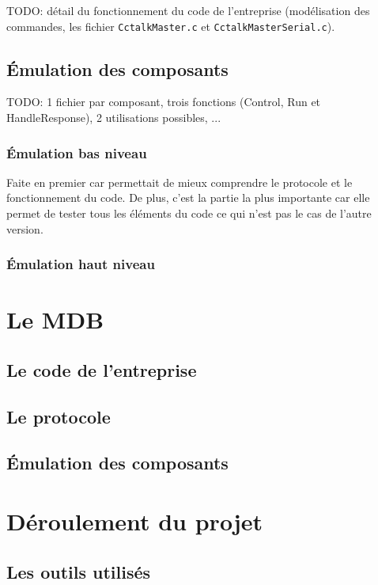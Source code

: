 \documentclass[a4paper]{article}
\begin{document}
TODO: détail du fonctionnement du code de l'entreprise (modélisation des
commandes, les fichier \lstinline{CctalkMaster.c} et
\lstinline{CctalkMasterSerial.c}).

\subsection{Émulation des composants}

TODO: 1 fichier par composant, trois fonctions (Control, Run et HandleResponse),
2 utilisations possibles, ...

\subsubsection{Émulation bas niveau}

Faite en premier car permettait de mieux comprendre le protocole et le
fonctionnement du code. De plus, c'est la partie la plus importante car elle
permet de tester tous les éléments du code ce qui n'est pas le cas de l'autre
version.

\subsubsection{Émulation haut niveau}

\section{Le MDB}

\subsection{Le code de l'entreprise}

\subsection{Le protocole}

\subsection{Émulation des composants}

\section{Déroulement du projet}

\subsection{Les outils utilisés}
\end{document}
